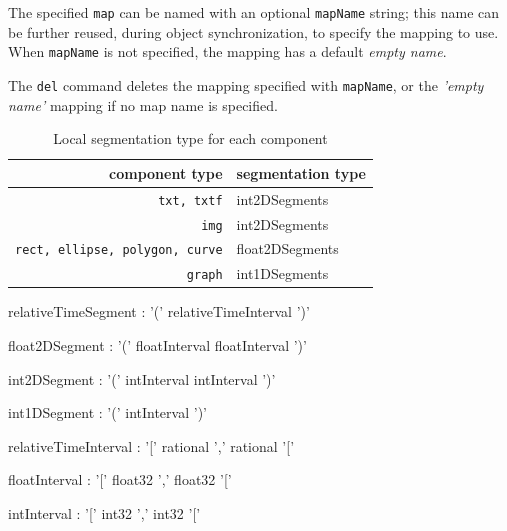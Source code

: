 \documentclass[a4paper,twoside]{report}
\newcommand{\OSC}[1]		{\texttt{#1}}
\begin{document}
The specified \OSC{map} can be named with an optional \OSC{mapName} string; this name can be further reused, during object synchronization, to specify the mapping to use. When \OSC{mapName} is not specified, the mapping has a default \emph{empty name}.

The \OSC{del} command deletes the mapping specified with \OSC{mapName}, or the \emph{'empty name'} mapping if no map name is specified.


\begin{table}[htbp]
\caption{Local segmentation type for each component}
\begin{center}
\begin{tabular}{|r|l|}
\hline
component type & segmentation type \\
\hline
\OSC{txt, txtf}		& int2DSegments \\
\OSC{img}			& int2DSegments \\
\OSC{rect, ellipse, polygon, curve}	&  float2DSegments \\
\OSC{graph}			&  int1DSegments \\
\hline
\end{tabular}
\end{center}
\label{maptable}
\end{table}

\begin{rail}
relativeTimeSegment : '(' relativeTimeInterval ')' 
\end{rail}
\begin{rail}
float2DSegment : '(' floatInterval floatInterval ')' 
\end{rail}
\begin{rail}
int2DSegment : '(' intInterval intInterval ')' 
\end{rail}
\begin{rail}
int1DSegment : '(' intInterval ')' 
\end{rail}


\begin{rail}
relativeTimeInterval : '[' rational ',' rational '[' 
\end{rail}
\begin{rail}
floatInterval : '[' float32 ',' float32 '['
\end{rail}
\begin{rail}
intInterval : '[' int32 ',' int32 '['
\end{rail}
\end{document}
